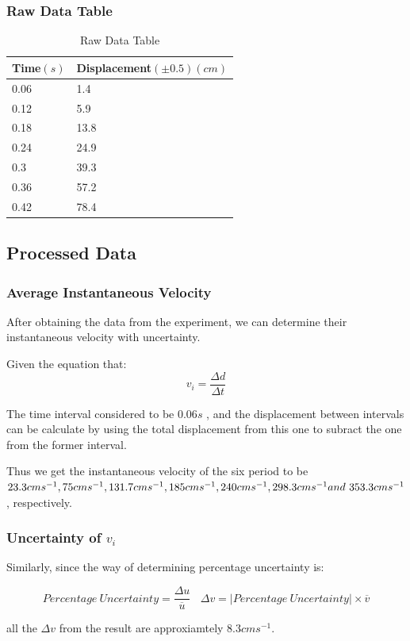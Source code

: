 \documentclass[12pt,a4paper]{article}
\begin{document}
\subsubsection{Raw Data Table}
\begin{table}[!ht]
    \centering
    \begin{tabular}{|l|l|}
    \hline
        \textbf{Time$(s)$} & \textbf{Displacement$(\pm 0.5)(cm)$} \\ \hline
        0.06  & 1.4  \\ \hline
        0.12  & 5.9  \\ \hline
        0.18  & 13.8  \\ \hline
        0.24  & 24.9  \\ \hline
        0.3  & 39.3  \\ \hline
        0.36  & 57.2  \\ \hline
        0.42 & 78.4 \\ \hline
    \end{tabular}
    \caption{Raw Data Table}
\end{table}
\subsection{Processed Data }
\subsubsection{Average Instantaneous Velocity}
After obtaining the data from the experiment, we can determine their instantaneous velocity with uncertainty.\par
Given the equation that:
$$
v_i= \frac{\Delta d}{\Delta t}
$$\par
The time interval considered to be $0.06s$ , and the displacement between intervals can 
be calculate
by using the total displacement from this one to subract the one from the former 
interval.
\par
Thus we get the instantaneous velocity of the six period to be 
$23.3cms^{-1}, 75cms^{-1}, \\ 131.7cms^{-1}, 
185cms^{-1},  240cms^{-1},  298.3cms^{-1} and\ 353.3cms^{-1}$
, respectively.\par
\subsubsection{Uncertainty of $v_i$}
Similarly, since the way of determining percentage uncertainty is:\par
$$
Percentage  \ Uncertainty = \frac{\Delta u}{\overline{u}} \ \ \ \ 
\Delta v = \left| Percentage \ Uncertainty \right| \times \overline{v} 
$$\par
all the $\Delta v $ from the result are approxiamtely $8.3cms^{-1}$.\par 
\end{document}

